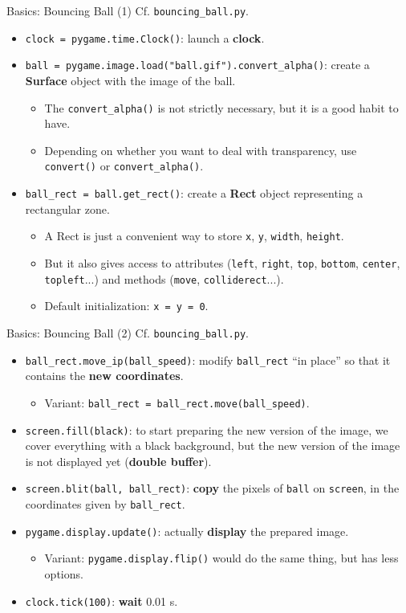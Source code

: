 \documentclass[aspectratio=169]{beamer}
\renewcommand{\emph}[1]{\textcolor{ClearTitle}{\bf #1}}
\begin{document}
\begin{frame}[fragile]{Basics: Bouncing Ball (1)}
Cf.  \verb|bouncing_ball.py|.

\begin{itemize}
\item \verb|clock = pygame.time.Clock()|: launch a \emph{clock}.
\item \verb|ball = pygame.image.load("ball.gif").convert_alpha()|: create a \emph{Surface} object with the image of the ball.
\begin{itemize}
\item The \verb|convert_alpha()| is not strictly necessary, but it is a good habit to have.
\item Depending on whether you want to deal with transparency, use \verb|convert()| or \verb|convert_alpha()|.
\end{itemize} 
\item \verb|ball_rect = ball.get_rect()|: create a \emph{Rect} object representing a rectangular zone.
\begin{itemize}
\item A Rect is just a convenient way to store \verb|x|, \verb|y|, \verb|width|, \verb|height|.
\item But it also gives access to attributes (\verb|left|, \verb|right|, \verb|top|, \verb|bottom|, \verb|center|, \verb|topleft|...) and methods (\verb|move|, \verb|colliderect|...).
\item Default initialization: \verb|x = y = 0|.
\end{itemize}
\end{itemize}
\end{frame}

\begin{frame}[fragile]{Basics: Bouncing Ball (2)}
Cf.  \verb|bouncing_ball.py|.

\begin{itemize}
\item \verb|ball_rect.move_ip(ball_speed)|: modify \verb|ball_rect| ``in place'' so that it contains the \emph{new coordinates}.
\begin{itemize}
\item Variant: \verb|ball_rect = ball_rect.move(ball_speed)|.
\end{itemize}
\item \verb|screen.fill(black)|: to start preparing the new version of the image, we cover everything with a black background, but the new version of the image is not displayed yet (\emph{double buffer}).
\item \verb|screen.blit(ball, ball_rect)|: \emph{copy} the pixels of \verb|ball| on \verb|screen|, in the coordinates given by \verb|ball_rect|.
\item \verb|pygame.display.update()|: actually \emph{display} the prepared image.
\begin{itemize}
\item Variant: \verb|pygame.display.flip()| would do the same thing, but has less options.
\end{itemize}
\item \verb|clock.tick(100)|: \emph{wait} 0.01 s.
\end{itemize}
\end{frame}
\end{document}
